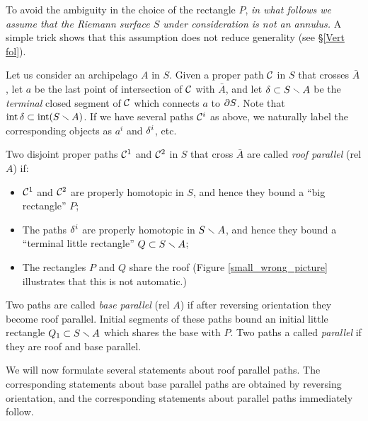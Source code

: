 To avoid the ambiguity in the choice of the rectangle $P$,
{\it in what follows we assume that the Riemann surface $S$ under consideration is not an annulus.}
A simple trick shows that this assumption  does not reduce generality (see \S \ref{Vert fol}). 

Let us consider an archipelago $A$ in $S$.
Given a   proper path ${\cal C}$ in $S$ that crosses  $\bar A$, 
let $a$ be the last point of intersection of ${\cal C}$ with $\bar A$,  
and let ${\delta}\subset S\smallsetminus A$ be the {\it terminal} closed segment of ${\cal C}$  which connects $a$ to $\partial S$.
Note that $\operatorname{int}{\delta} \subset \operatorname{int}( S\smallsetminus A)$.  
If we have several paths ${\cal C}^i$ as above,
we naturally label the corresponding objects as $a^i$ and ${\delta}^i$, etc. 

Two disjoint proper paths ${\cal C}^1$ and ${\cal C}^2$ in $S$ that cross $\bar A$  
are called {\it roof parallel} (rel $A$) if:
\begin{itemize}
\item  ${\cal C}^1$ and ${\cal C}^2$ are properly homotopic in $S$, and hence they bound a  ``big rectangle'' $P$; 
\item  
The  paths ${\delta}^i$ are properly homotopic in $S\smallsetminus A$, and hence they bound a ``terminal little rectangle''
      $Q \subset S\smallsetminus A$;
\item %
    The rectangles $P$ and $Q$ share the roof (Figure \ref{small_wrong_picture} illustrates that this is not automatic.)
\end{itemize}




Two paths are called {\it base parallel} (rel $A$) if after reversing orientation
they become roof parallel. Initial segments of these paths bound an initial little rectangle $Q_1\subset S\smallsetminus A$
which shares the base with $P$. Two paths a called {\it parallel} if they are roof and base parallel.

We will now formulate several statements about roof parallel paths. 
The corresponding statements about base parallel paths are obtained by reversing orientation,
and the corresponding statements about parallel paths immediately follow.


